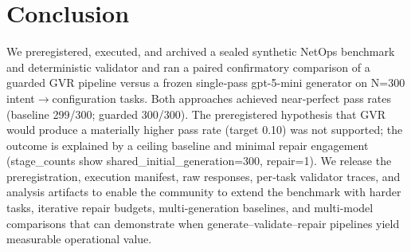 \documentclass[conference]{IEEEtran}
\begin{document}
\section{Conclusion}
We preregistered, executed, and archived a sealed synthetic NetOps benchmark and deterministic validator and ran a paired confirmatory comparison of a guarded GVR pipeline versus a frozen single‑pass gpt-5-mini generator on N=300 intent\ensuremath{\rightarrow}configuration tasks. Both approaches achieved near‑perfect pass rates (baseline 299/300; guarded 300/300). The preregistered hypothesis that GVR would produce a materially higher pass rate (target 0.10) was not supported; the outcome is explained by a ceiling baseline and minimal repair engagement (stage\_counts show shared\_initial\_generation=300, repair=1). We release the preregistration, execution manifest, raw responses, per‑task validator traces, and analysis artifacts to enable the community to extend the benchmark with harder tasks, iterative repair budgets, multi‑generation baselines, and multi‑model comparisons that can demonstrate when generate--validate--repair pipelines yield measurable operational value.
\end{document}
